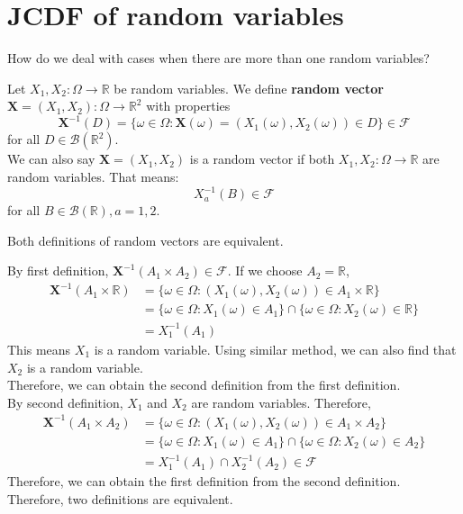 \documentclass{huhtakm-template-book}
\begin{document}
\section{JCDF of random variables}
How do we deal with cases when there are more than one random variables?
\begin{defn}
	Let $X_{1},X_{2}:\Omega\to\mathbb{R}$ be random variables. We define \textbf{random vector} $\mathbf{X}=(X_{1},X_{2}):\Omega\to\mathbb{R}^{2}$ with properties
	\begin{equation*}
		\mathbf{X}^{-1}(D)=\{\omega\in\Omega:\mathbf{X}(\omega)=(X_{1}(\omega),X_{2}(\omega))\in D\}\in\mathcal{F}
	\end{equation*}
	for all $D\in\mathcal{B}(\mathbb{R}^{2})$.\\
	We can also say $\mathbf{X}=(X_{1},X_{2})$ is a random vector if both $X_{1},X_{2}:\Omega\to\mathbb{R}$ are random variables. That means:
	\begin{equation*}
		X_{a}^{-1}(B)\in\mathcal{F}
	\end{equation*}
	for all $B\in\mathcal{B}(\mathbb{R}),a=1,2$.
\end{defn}
\begin{cla}
	Both definitions of random vectors are equivalent.
\end{cla}
\begin{proofing}
	By first definition, $\mathbf{X}^{-1}(A_{1}\times A_{2})\in\mathcal{F}$. If we choose $A_{2}=\mathbb{R}$,
	\begin{align*}
		\mathbf{X}^{-1}(A_{1}\times \mathbb{R})&=\{\omega\in\Omega:(X_{1}(\omega),X_{2}(\omega))\in A_{1}\times\mathbb{R}\}\\
		&=\{\omega\in\Omega:X_{1}(\omega)\in A_{1}\}\cap\{\omega\in\Omega:X_{2}(\omega)\in\mathbb{R}\}\\
		&=X_{1}^{-1}(A_{1})
	\end{align*}
	This means $X_{1}$ is a random variable. Using similar method, we can also find that $X_{2}$ is a random variable.\\
	Therefore, we can obtain the second definition from the first definition.\\
	By second definition, $X_{1}$ and $X_{2}$ are random variables. Therefore,
	\begin{align*}
		\mathbf{X}^{-1}(A_{1}\times A_{2})&=\{\omega\in\Omega:(X_{1}(\omega),X_{2}(\omega))\in A_{1}\times A_{2}\}\\
		&=\{\omega\in\Omega:X_{1}(\omega)\in A_{1}\}\cap\{\omega\in\Omega:X_{2}(\omega)\in A_{2}\}\\
		&=X_{1}^{-1}(A_{1})\cap X_{2}^{-1}(A_{2})\in\mathcal{F}
	\end{align*}
	Therefore, we can obtain the first definition from the second definition.\\
	Therefore, two definitions are equivalent.
\end{proofing}
\end{document}
